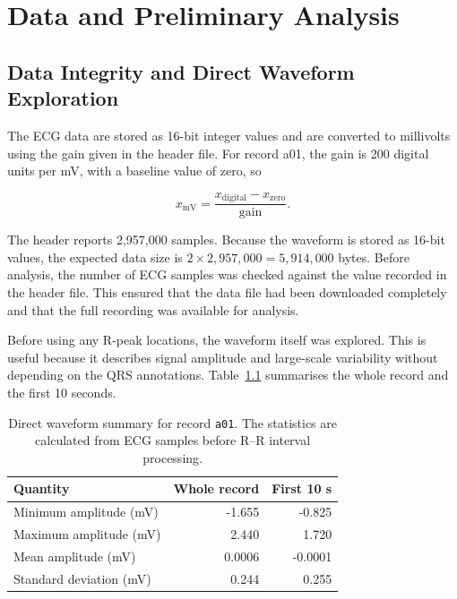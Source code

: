 \documentclass[a4paper,10.5pt,oneside]{report}
\begin{document}
\chapter{Data and Preliminary Analysis}

\section{Data Integrity and Direct Waveform Exploration}

The ECG data are stored as 16-bit integer values and are converted to millivolts using the gain given in the header file. For record a01, the gain is 200 digital units per mV, with a baseline value of zero, so

\begin{equation}
    x_{\mathrm{mV}}
    =
    \frac{x_{\mathrm{digital}}-x_{\mathrm{zero}}}{\mathrm{gain}}.
    \label{eq:scaling}
\end{equation}

The header reports 2,957,000 samples. Because the waveform is stored as
16-bit values, the expected data size is $2\times2{,}957{,}000=5{,}914{,}000$
bytes. Before analysis, the number of ECG samples was checked against the value recorded in the header file. This ensured that the data file had been downloaded completely and that the full recording was available for analysis.

Before using any R-peak locations, the waveform itself was explored. This is
useful because it describes signal amplitude and large-scale variability
without depending on the QRS annotations. Table~\ref{tab:waveformsummary}
summarises the whole record and the first 10 seconds.

\begin{table}[H]
\centering
\caption{Direct waveform summary for record \texttt{a01}. The statistics are
calculated from ECG samples before R--R interval processing.}
\label{tab:waveformsummary}
\begin{tabular}{lrr}
\toprule
Quantity & Whole record & First 10 s \\
\midrule
Minimum amplitude (mV) & -1.655 & -0.825 \\
Maximum amplitude (mV) &  2.440 &  1.720 \\
Mean amplitude (mV)    &  0.0006 & -0.0001 \\
Standard deviation (mV)&  0.244 &  0.255 \\
\bottomrule
\end{tabular}
\end{table}
\end{document}
